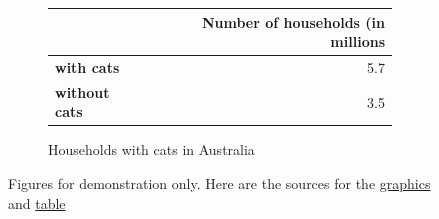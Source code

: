 \begin{figure}[ht!]
  \begin{subfigure}[c]{\textwidth}
  \centering
    \begin{tabulary}{\columnwidth}{lr}
    \toprule
        & \textbf{Number of households (in millions}  \\
    \hline
        \textbf{with cats} & 5.7 \\
        \textbf{without cats} & 3.5  \\
    \bottomrule
    \end{tabulary}
    \caption{Households with cats in Australia}
    \label{tab:cats}
  \end{subfigure}\hfill
  \vspace{0.2cm}
  
  \caption{Figures for demonstration only. Here are the sources for the \href{https://visme.co/blog/funny-graphs/}{graphics} and \href{https://www.vetvoice.com.au/ec/pet-ownership/pet-ownership-statistics/}{table}}
  \label{fig:demo}
\end{figure}
